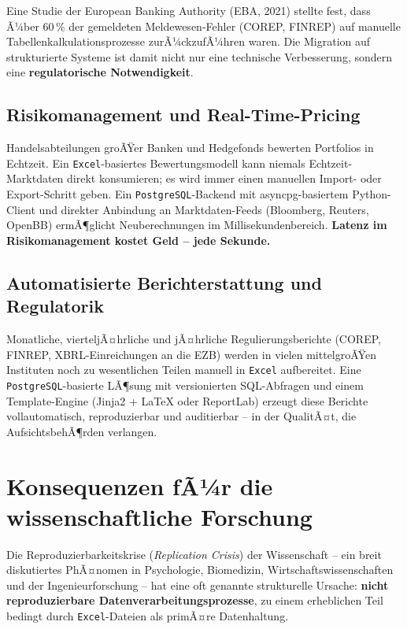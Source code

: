 ﻿\documentclass[12pt,a4paper]{report}
\theoremstyle{definition}
\theoremstyle{remark}
\newcommand{\excel}{\texttt{Excel}}
\newcommand{\pg}{\texttt{PostgreSQL}}
\begin{document}
Eine Studie der European Banking Authority (EBA, 2021)
stellte fest, dass Ã¼ber 60\,\% der gemeldeten Meldewesen-Fehler
(COREP, FINREP) auf manuelle Tabellenkalkulationsprozesse
zurÃ¼ckzufÃ¼hren waren. Die Migration auf strukturierte Systeme
ist damit nicht nur eine technische Verbesserung, sondern eine
\textbf{regulatorische Notwendigkeit}.

\subsection{Risikomanagement und Real-Time-Pricing}

Handelsabteilungen groÃŸer Banken und Hedgefonds bewerten Portfolios
in Echtzeit. Ein \excel-basiertes Bewertungsmodell kann niemals
Echtzeit-Marktdaten direkt konsumieren; es wird immer einen manuellen
Import- oder Export-Schritt geben.
Ein \pg-Backend mit asyncpg-basiertem Python-Client und direkter
Anbindung an Marktdaten-Feeds (Bloomberg, Reuters, OpenBB) ermÃ¶glicht
Neuberechnungen im Millisekundenbereich.
\textbf{Latenz im Risikomanagement kostet Geld -- jede Sekunde.}

\subsection{Automatisierte Berichterstattung und Regulatorik}

Monatliche, vierteljÃ¤hrliche und jÃ¤hrliche Regulierungsberichte
(COREP, FINREP, XBRL-Einreichungen an die EZB) werden in vielen
mittelgroÃŸen Instituten noch zu wesentlichen Teilen manuell in
\excel{} aufbereitet.
Eine \pg-basierte LÃ¶sung mit versionierten SQL-Abfragen und einem
Template-Engine (Jinja2 + \LaTeX{} oder ReportLab) erzeugt diese
Berichte vollautomatisch, reproduzierbar und auditierbar -- in der
QualitÃ¤t, die AufsichtsbehÃ¶rden verlangen.

\section{Konsequenzen fÃ¼r die wissenschaftliche Forschung}

Die Reproduzierbarkeitskrise (\textit{Replication Crisis}) der
Wissenschaft -- ein breit diskutiertes PhÃ¤nomen in Psychologie,
Biomedizin, Wirtschaftswissenschaften und der Ingenieurforschung --
hat eine oft genannte strukturelle Ursache: \textbf{nicht
reproduzierbare Datenverarbeitungsprozesse}, zu einem erheblichen
Teil bedingt durch \excel-Dateien als primÃ¤re Datenhaltung.
\end{document}
